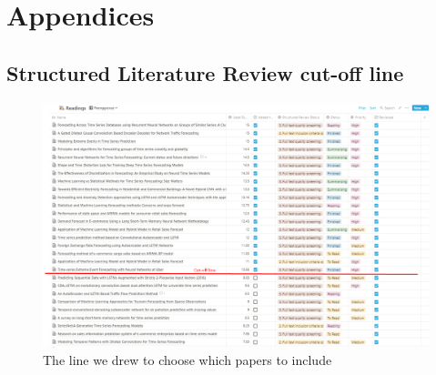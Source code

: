 
\chapter{Appendices}
\label{cha:appendices}

\section{Structured Literature Review cut-off line}
\label{cha:slr-cut-off-line}

\begin{figure}
  \centering
  \includegraphics[width=\textwidth]{./figs/illustrations/LSR-cut-off-line.png}
  \hfill
  \caption{The line we drew to choose which papers to include}
  \label{fig:slr-cut-off-line}
\end{figure}

